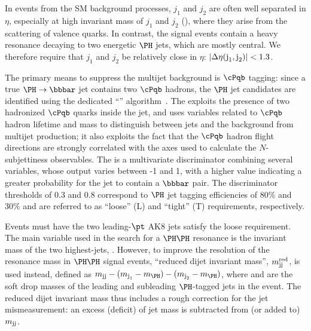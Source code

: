In events from the SM background processes, $j_{1}$ and $j_{2}$
are often well separated in $\eta$, especially at high invariant mass of $j_{1}$ and $j_{2}$ (\mjj), 
where they arise from the scattering of valence quarks.  
In contrast, the signal events contain a heavy resonance decaying
to two energetic $\PH$ jets, which are mostly central.
We therefore require that $j_{1}$ and $j_{2}$ be
relatively close in $\eta$: $|\Delta\eta(\text{j}_{1}, \text{j}_{2})| < 1.3$.

The primary means to suppress the multijet background is
$\cPqb$ tagging: since a true $\PH \to \bbbar$ jet contains two $\cPqb$ hadrons,
the $\PH$ jet candidates are identified using the dedicated ``\Hbbt''
algorithm~\cite{CMS-PAS-BTV-15-002}. The \Hbbt exploits the presence
of two hadronized $\cPqb$ quarks inside the \PH jet, and uses
variables related to $\cPqb$ hadron lifetime and mass to distinguish between
\PH jets and the background from multijet production; it also exploits
the fact that the $\cPqb$ hadron flight directions are strongly correlated
with the axes used to calculate the $N$-subjettiness observables.
The \Hbbt is a multivariate discriminator combining several variables,
 whose output varies between -1 and 1, 
with a higher value indicating a greater probability for the jet to contain a $\bbbar$ pair.
The \Hbbt discriminator thresholds of 0.3 and 0.8 correspond to $\PH$ jet
tagging efficiencies of 80\% and 30\% and are referred to as ``loose''
(L) and ``tight'' (T) requirements, respectively. 

Events must have the two leading-$\pt$ AK8 jets satisfy the loose \Hbbt
requirement. 
The main variable used in the search for a $\PH\PH$ resonance is the
invariant mass of the two highest-\pt jets, \mjj. However,
to improve the
resolution of the resonance mass in $\PH\PH$ signal events, 
``reduced dijet invariant mass'', $m_{\text{jj}}^{\text{red}}$,
is used instead,
defined as $\mjj - (\mjone - \mH) - (\mjtwo - \mH)$, where \mjone and
\mjtwo are the soft drop masses of the leading and subleading
$\PH$-tagged jets in the event.  The reduced
dijet invariant mass thus includes a rough correction for the \PH jet
mismeasurement: an excess (deficit) of \PH jet mass is subtracted
from (or added to) $m_{\text{jj}}$.  

